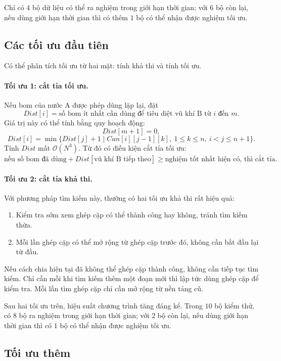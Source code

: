 \documentclass[11pt]{article}
\newcommand{\Oh}{\mathcal{O}}
\begin{document}
Chỉ có $4$ bộ dữ liệu có thể ra nghiệm trong giới hạn thời gian; với $6$ bộ
còn lại, nếu dùng giới hạn thời gian thì có thêm $1$ bộ có thể nhận được nghiệm
tối ưu.

\subsection{Các tối ưu đầu tiên}

Có thể phân tích tối ưu từ hai mặt: tính khả thi và tính tối ưu.

\paragraph{Tối ưu 1: cắt tỉa tối ưu.}
Nếu bom của nước A được phép dùng lặp lại, đặt
\[
  \mathit{Dist}[i]=\text{số bom ít nhất cần dùng để tiêu diệt vũ khí B từ }i
  \text{ đến }m.
\]
Giá trị này có thể tính bằng quy hoạch động:
\[
  \mathit{Dist}[m+1]=0,
\]
\[
  \mathit{Dist}[i]=
  \min\{\mathit{Dist}[j]+1\mid
       \mathit{Can}[i][j-1][k],\ 1\le k\le n,\ i<j\le n+1\}.
\]
Tính $\mathit{Dist}$ mất $\Oh(N^3)$. Từ đó có điều kiện cắt tỉa tối ưu:
\[
\text{nếu số bom đã dùng}+\mathit{Dist}[\text{vũ khí B tiếp theo}]
\ge \text{nghiệm tốt nhất hiện có, thì cắt tỉa.}
\]

\paragraph{Tối ưu 2: cắt tỉa khả thi.}
Với phương pháp tìm kiếm này, thường có hai tối ưu khả thi rất hiệu quả:
\begin{enumerate}
  \item Kiểm tra sớm xem ghép cặp có thể thành công hay không, tránh tìm kiếm
  thừa.
  \item Mỗi lần ghép cặp có thể mở rộng từ ghép cặp trước đó, không cần bắt
  đầu lại từ đầu.
\end{enumerate}

Nếu cách chia hiện tại đã không thể ghép cặp thành công, không cần tiếp tục
tìm kiếm. Chỉ cần mỗi khi tìm kiếm thêm một đoạn mới thì lập tức dùng ghép cặp
để kiểm tra. Mỗi lần tìm ghép cặp chỉ cần mở rộng từ nền tảng cũ.

Sau hai tối ưu trên, hiệu suất chương trình tăng đáng kể. Trong $10$ bộ kiểm
thử, có $8$ bộ ra nghiệm trong giới hạn thời gian; với $2$ bộ còn lại, nếu
dùng giới hạn thời gian thì có $1$ bộ có thể nhận được nghiệm tối ưu.

\subsection{Tối ưu thêm}
\end{document}
